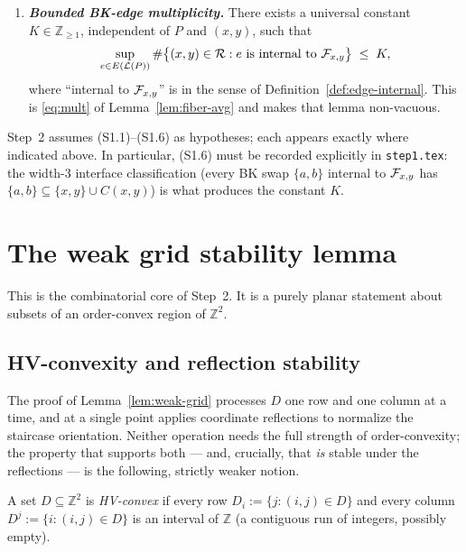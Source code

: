 \begin{definition}
\begin{enumerate}[label=\textup{(S1.\arabic*)}, leftmargin=*]
    \item \emph{\textbf{Bounded BK-edge multiplicity.}} There exists a universal
          constant $K\in\mathbb{Z}_{\ge 1}$, independent of $P$ and $(x,y)$, such
          that
          \[
            \sup_{e\in E(\mathcal{L}(P))}
              \#\bigl\{(x,y)\in\mathcal{R} : e\text{ is internal to }\mathcal{F}_{x,y}\bigr\}
              \;\le\; K,
          \]
          where ``internal to $\mathcal{F}_{x,y}$'' is in the sense of
          Definition~\ref{def:edge-internal}. This is \eqref{eq:mult} of
          Lemma~\ref{lem:fiber-avg} and makes that lemma non-vacuous.
\end{enumerate}
\end{definition}

Step~2 assumes (S1.1)--(S1.6) as hypotheses; each
appears exactly where indicated above. In particular, (S1.6) must be recorded
explicitly in \texttt{step1.tex}: the width-$3$ interface classification (every BK
swap $\{a,b\}$ internal to $\mathcal{F}_{x,y}$ has $\{a,b\}\subseteq\{x,y\}\cup C(x,y)$)
is what produces the constant $K$.

\section{The weak grid stability lemma}
\label{sec:weak-grid}

This is the combinatorial core of Step~2. It is a purely planar statement about
subsets of an order-convex region of $\mathbb{Z}^2$.

\subsection{HV-convexity and reflection stability}
\label{subsec:hv-convex}

The proof of Lemma~\ref{lem:weak-grid} processes $D$ one row and one column at a
time, and at a single point applies coordinate reflections to normalize the
staircase orientation. Neither operation needs the full strength of
order-convexity; the property that supports both --- and, crucially, that
\emph{is} stable under the reflections --- is the following, strictly weaker
notion.

\begin{definition}\label{def:hv-convex}
A set $D\subseteq\mathbb{Z}^2$ is \emph{HV-convex} if every row
$D_i:=\{j:(i,j)\in D\}$ and every column $D^j:=\{i:(i,j)\in D\}$ is an interval
of $\mathbb{Z}$ (a contiguous run of integers, possibly empty).
\end{definition}

